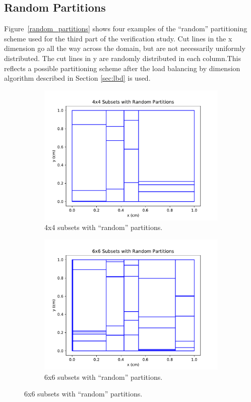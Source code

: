 \subsection{Random Partitions}
Figure~\ref{random_partitions} shows four examples of the ``random'' partitioning scheme used for the third part of the verification study. Cut lines in the x dimension go all the way across the domain, but are not necessarily uniformly distributed. The cut lines in y are randomly distributed in each column.This reflects a possible partitioning scheme after the load balancing by dimension algorithm described in Section \ref{sec:lbd} is used.
\begin{figure}[H]
\centering
\begin{subfigure}[b]{0.45\textwidth}
  \includegraphics[width=\textwidth]{../cut_line_files/4_random.pdf}
  \caption{4x4 subsets with ``random'' partitions.}
  \label{4random}
\end{subfigure}
\begin{subfigure}[b]{0.45\textwidth}
  \includegraphics[width=\textwidth]{../cut_line_files/6_random.pdf}
  \caption{6x6 subsets with ``random'' partitions.}
  \label{6random}
\end{subfigure}


\end{figure}
